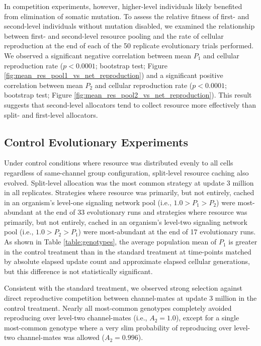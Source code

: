 

In competition experiments, however, higher-level individuals likely benefited from elimination of somatic mutation.
To assess the relative fitness of first- and second-level individuals without mutation disabled, we examined the relationship between first- and second-level resource pooling and the rate of cellular reproduction at the end of each of the 50 replicate evolutionary trials performed.
We observed a significant negative correlation between mean $P_1$ and cellular reproduction rate ($p < 0.0001$; bootstrap test; Figure \ref{fig:mean_res_pool1_vs_net_reproduction}) and a significant positive correlation between mean $P_2$ and cellular reproduction rate ($p < 0.0001$; bootstrap test; Figure \ref{fig:mean_res_pool2_vs_net_reproduction}).
This result suggests that second-level allocators tend to collect resource more effectively than split- and first-level allocators.

\subsection{Control Evolutionary Experiments}



Under control conditions where resource was distributed evenly to all cells regardless of same-channel group configuration, split-level resource caching also evolved.
Split-level allocation was the most common strategy at update 3 million in all replicates.
Strategies where resource was primarily, but not entirely, cached in an organism's level-one signaling network pool (i.e., $1.0 > P_1 > P_2$) were most-abundant at the end of 33 evolutionary runs and strategies where resource was primarily, but not entirely, cached in an organism's level-two signaling network pool (i.e., $1.0 > P_2 > P_1$) were most-abundant at the end of 17 evolutionary runs.
As shown in Table \ref{table:genotypes}, the average population mean of $P_1$ is greater in the control treatment than in the standard treatment at time-points matched by absolute elapsed update count and approximate elapsed cellular generations, but this difference is not statistically significant.

Consistent with the standard treatment, we observed strong selection against direct reproductive competition between channel-mates at update 3 million in the control treatment.
Nearly all most-common genotypes completely avoided reproducing over level-two channel-mates (i.e., $A_2 = 1.0$), except for a single most-common genotype where a very slim probability of reproducing over level-two channel-mates was allowed ($A_2 = 0.996$).

